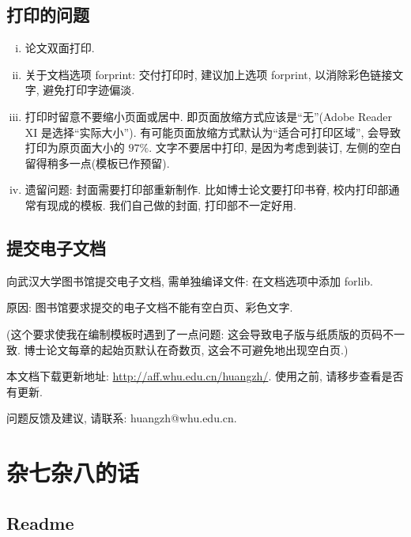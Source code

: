 \documentclass{ice_report}  %
\begin{document}
\section{打印的问题}
\begin{enumerate}[i)]
  \item  论文双面打印.
  \item  关于文档选项 forprint: 交付打印时, 建议加上选项 forprint, 以消除彩色链接文字, 避免打印字迹偏淡.
  \item  打印时留意不要缩小页面或居中. 即页面放缩方式应该是``无''(Adobe Reader XI 是选择``实际大小'').
           有可能页面放缩方式默认为``适合可打印区域'', 会导致打印为原页面大小的 $97\%$.
           文字不要居中打印, 是因为考虑到装订, 左侧的空白留得稍多一点(模板已作预留).
  \item  遗留问题: 封面需要打印部重新制作. 比如博士论文要打印书脊, 校内打印部通常有现成的模板.
           我们自己做的封面, 打印部不一定好用.
\end{enumerate}




\section{提交电子文档}

向武汉大学图书馆提交电子文档, 需单独编译文件: 在文档选项中添加 forlib.

原因: 图书馆要求提交的电子文档不能有空白页、彩色文字.

({\kaishu 这个要求使我在编制模板时遇到了一点问题: 这会导致电子版与纸质版的页码不一致. 博士论文每章的起始页默认在奇数页, 这会不可避免地出现空白页.})


\vfill

本文档下载更新地址: \url{http://aff.whu.edu.cn/huangzh/}. 使用之前, 请移步查看是否有更新.

问题反馈及建议, 请联系: huangzh@whu.edu.cn.

\chapter{杂七杂八的话}

\section{Readme}
\end{document}
